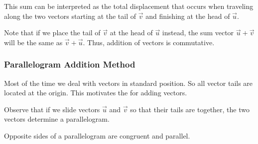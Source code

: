 \documentclass{ximera}
\begin{document}
This sum can be interpreted as the total displacement that occurs when traveling along the two vectors starting at the tail of $\vec{v}$ and finishing at the head of $\vec{u}$.

Note that if we place the tail of $\vec{v}$ at the head of $\vec{u}$ instead, the sum vector $\vec{u}+\vec{v}$ will be the same as $\vec{v}+\vec{u}$.  Thus, addition of vectors is commutative.
\subsubsection*{Parallelogram Addition Method}
Most of the time we deal with vectors in standard position.  So all vector tails are located at the origin.  This motivates the  for adding vectors.  

Observe that if we slide vectors $\vec{u}$ and $\vec{v}$ so that their tails are together, the two vectors determine a parallelogram.  

\begin{center}
\end{center}

Opposite sides of a parallelogram are congruent and parallel.

\begin{center}
\end{center}
\end{document}
